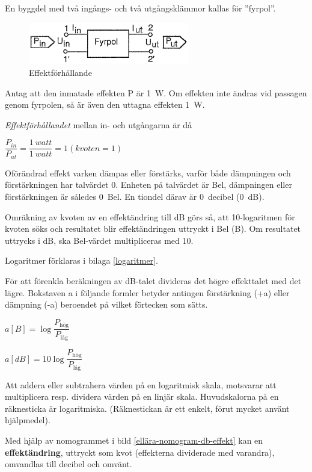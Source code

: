 En byggdel med två ingångs- och två utgångsklämmor kallas för ''fyrpol''.

\begin{figure}[ht]
\begin{center}
\includegraphics[width=7cm]{images/cropped_pdfs/bild_2_1-32.pdf}
\caption{Effektförhållande}
\label{fig:BildII1-32}
\end{center}
\end{figure}

Antag att den inmatade effekten P är 1~W.
Om effekten inte ändras vid passagen genom fyrpolen, så är även den uttagna
effekten 1~W.

\emph{Effektförhållandet} mellan in- och utgångarna är då

\(\dfrac{P_{in}}{P_{ut}} = \dfrac{1\ watt}{1\ watt} = 1 (kvoten = 1)\)

Oförändrad effekt varken dämpas eller förstärks, varför både dämpningen och
förstärkningen har talvärdet 0.
Enheten på talvärdet är Bel, dämpningen eller förstärkningen är således 0~Bel.
En tiondel därav är 0~decibel (0~dB).

Omräkning av kvoten av en effektändring till dB görs så, att 10-logaritmen för
kvoten söks och resultatet blir effektändringen uttryckt i Bel (B). Om
resultatet uttrycks i dB, ska Bel-värdet multipliceras med 10.

Logaritmer förklaras i bilaga \ref{logaritmer}.

För att förenkla beräkningen av dB-talet divideras det högre effekttalet med det
lägre.
Bokstaven a i följande formler betyder antingen förstärkning (+a) eller
dämpning (-a) beroendet på vilket förtecken som sätts.

\(a[B] = \log \dfrac{P_\text{hög}}{P_\text{låg}}\)

\(a[dB] = 10\log \dfrac{P_\text{hög}}{P_\text{låg}}\)

Att addera eller subtrahera värden på en logaritmisk skala, motsvarar att
multiplicera resp. dividera värden på en linjär skala.
Huvudskalorna på en räknesticka är logaritmiska.
(Räknestickan är ett enkelt, förut mycket använt hjälpmedel).

Med hjälp av nomogrammet i bild \ref{ellära-nomogram-db-effekt} kan en
\textbf{effektändring}, uttryckt som kvot (effekterna dividerade med varandra),
omvandlas till decibel och omvänt.

